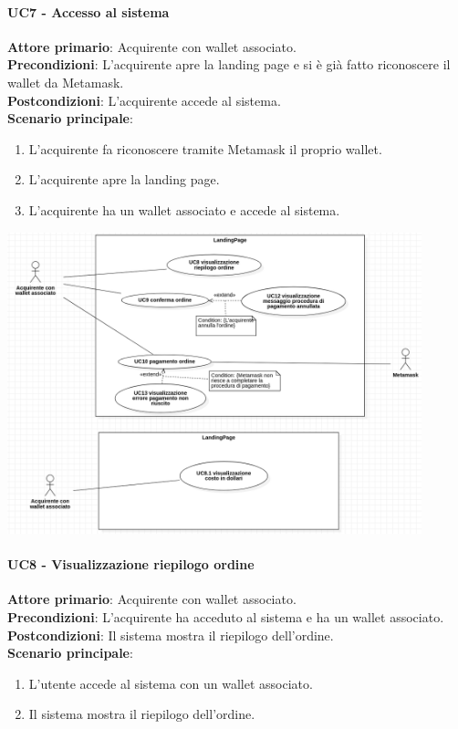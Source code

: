 \documentclass[a4paper, 12pt]{article}
\begin{document}
\paragraph{UC7 - Accesso al sistema}
\textbf{Attore primario}: Acquirente con wallet associato.\\
\textbf{Precondizioni}: L'acquirente apre la landing page e si è già fatto riconoscere il wallet da Metamask.\\
\textbf{Postcondizioni}: L'acquirente accede al sistema.\\
\textbf{Scenario principale}:
\begin{enumerate}
    \item L'acquirente fa riconoscere tramite Metamask il proprio wallet.
    \item L'acquirente apre la landing page.
    \item L'acquirente ha un wallet associato e accede al sistema.
\end{enumerate}

\includegraphics[width=0.9\textwidth]{UseCase_landing_page3}

\paragraph{UC8 - Visualizzazione riepilogo ordine}
\textbf{Attore primario}: Acquirente con wallet associato.\\
\textbf{Precondizioni}: L'acquirente ha acceduto al sistema e ha un wallet associato.\\
\textbf{Postcondizioni}: Il sistema mostra il riepilogo dell'ordine.\\
\textbf{Scenario principale}:
\begin{enumerate}
    \item L’utente accede al sistema con un wallet associato.
    \item Il sistema mostra il riepilogo dell'ordine.
\end{enumerate}
\end{document}
